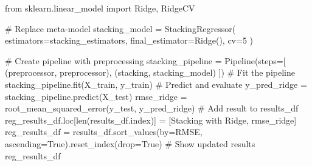 \documentclass[
  letterpaper,
  DIV=11,
  numbers=noendperiod]{scrreprt}
\newenvironment{Shaded}{\begin{snugshade}}{\end{snugshade}}
\newcommand{\BuiltInTok}[1]{\textcolor[rgb]{0.00,0.23,0.31}{#1}}
\newcommand{\CommentTok}[1]{\textcolor[rgb]{0.37,0.37,0.37}{#1}}
\newcommand{\DecValTok}[1]{\textcolor[rgb]{0.68,0.00,0.00}{#1}}
\newcommand{\ImportTok}[1]{\textcolor[rgb]{0.00,0.46,0.62}{#1}}
\newcommand{\NormalTok}[1]{\textcolor[rgb]{0.00,0.23,0.31}{#1}}
\newcommand{\OperatorTok}[1]{\textcolor[rgb]{0.37,0.37,0.37}{#1}}
\newcommand{\StringTok}[1]{\textcolor[rgb]{0.13,0.47,0.30}{#1}}
\newcommand{\VariableTok}[1]{\textcolor[rgb]{0.07,0.07,0.07}{#1}}
\begin{document}
\begin{Shaded}
\begin{Highlighting}[]
\ImportTok{from}\NormalTok{ sklearn.linear\_model }\ImportTok{import}\NormalTok{ Ridge, RidgeCV}

\CommentTok{\# Replace meta{-}model}
\NormalTok{stacking\_model }\OperatorTok{=}\NormalTok{ StackingRegressor(}
\NormalTok{    estimators}\OperatorTok{=}\NormalTok{stacking\_estimators,}
\NormalTok{    final\_estimator}\OperatorTok{=}\NormalTok{Ridge(),}
\NormalTok{    cv}\OperatorTok{=}\DecValTok{5}
\NormalTok{)}

\CommentTok{\# Create pipeline with preprocessing}
\NormalTok{stacking\_pipeline }\OperatorTok{=}\NormalTok{ Pipeline(steps}\OperatorTok{=}\NormalTok{[}
\NormalTok{    (}\StringTok{\textquotesingle{}preprocessor\textquotesingle{}}\NormalTok{, preprocessor),}
\NormalTok{    (}\StringTok{\textquotesingle{}stacking\textquotesingle{}}\NormalTok{, stacking\_model)}
\NormalTok{])}
\CommentTok{\# Fit the pipeline}
\NormalTok{stacking\_pipeline.fit(X\_train, y\_train)}
\CommentTok{\# Predict and evaluate}
\NormalTok{y\_pred\_ridge }\OperatorTok{=}\NormalTok{ stacking\_pipeline.predict(X\_test)}
\NormalTok{rmse\_ridge }\OperatorTok{=}\NormalTok{ root\_mean\_squared\_error(y\_test, y\_pred\_ridge)}
\CommentTok{\# Add result to results\_df}
\NormalTok{reg\_results\_df.loc[}\BuiltInTok{len}\NormalTok{(results\_df.index)] }\OperatorTok{=}\NormalTok{ [}\StringTok{\textquotesingle{}Stacking with Ridge\textquotesingle{}}\NormalTok{, rmse\_ridge]}
\NormalTok{reg\_results\_df }\OperatorTok{=}\NormalTok{ results\_df.sort\_values(by}\OperatorTok{=}\StringTok{\textquotesingle{}RMSE\textquotesingle{}}\NormalTok{, ascending}\OperatorTok{=}\VariableTok{True}\NormalTok{).reset\_index(drop}\OperatorTok{=}\VariableTok{True}\NormalTok{)}
\CommentTok{\# Show updated results}
\NormalTok{reg\_results\_df}
\end{Highlighting}
\end{Shaded}
\end{document}
